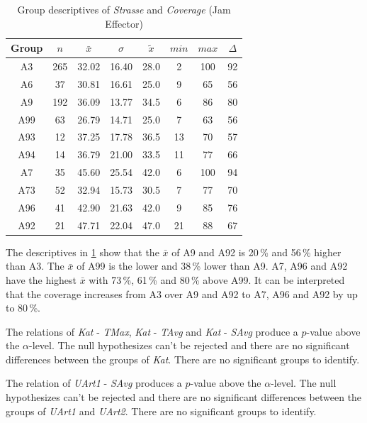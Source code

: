 \begin{table}[ht!]
	\tiny
	\centering
	\begin{tabular}{c|c|c|c|c|c|c|c}
		\toprule
		Group & $n$ & $\bar{x}$ & $\sigma$ & $\tilde{x}$ & $min$ & $max$ & $\Delta$ \\
		\midrule
		A3   & 265 & 32.02 & 16.40 & 28.0 & 2  & 100 & 92 \\ 
		A6   & 37  & 30.81 & 16.61 & 25.0 & 9  & 65  & 56 \\ 
		A9   & 192 & 36.09 & 13.77 & 34.5 & 6  & 86  & 80 \\ 
		A99  & 63  & 26.79 & 14.71 & 25.0 & 7  & 63  & 56 \\ 
		A93  & 12  & 37.25 & 17.78 & 36.5 & 13 & 70  & 57 \\ 
		A94  & 14  & 36.79 & 21.00 & 33.5 & 11 & 77  & 66 \\ 
		A7   & 35  & 45.60 & 25.54 & 42.0 & 6  & 100 & 94 \\ 
		A73  & 52  & 32.94 & 15.73 & 30.5 & 7  & 77  & 70 \\ 
		A96  & 41  & 42.90 & 21.63 & 42.0 & 9  & 85  & 76 \\ 
		A92  & 21  & 47.71 & 22.04 & 47.0 & 21 & 88  & 67 \\ 
		\bottomrule
	  \end{tabular}
    \caption{Group descriptives of \textit{Strasse} and \textit{Coverage} (Jam Effector)}
    \label{tbl:descriptives_baysis_effector_Strasse_Cov}
\end{table}
The descriptives in \cref{tbl:descriptives_baysis_effector_Strasse_Cov} show that the $\bar{x}$ of A9 and A92 is 20\,\% and 56\,\% higher than A3. The $\bar{x}$ of A99 is the lower and 38\,\% lower than A9. A7, A96 and A92 have the highest $\bar{x}$ with 73\,\%, 61\,\% and 80\,\% above A99. It can be interpreted that the coverage increases from A3 over A9 and A92 to A7, A96 and A92 by up to 80\,\%.

\clearpage

The relations of \textit{Kat} - \textit{TMax}, \textit{Kat} - \textit{TAvg} and \textit{Kat} - \textit{SAvg} produce a $p$-value above the $\alpha$-level. The null hypothesizes can't be rejected and there are no significant differences between the groups of \textit{Kat}. There are no significant groups to identify.

The relation of \textit{UArt1} - \textit{SAvg} produces a $p$-value above the $\alpha$-level. The null hypothesizes can't be rejected and there are no significant differences between the groups of \textit{UArt1} and \textit{UArt2}. There are no significant groups to identify.

